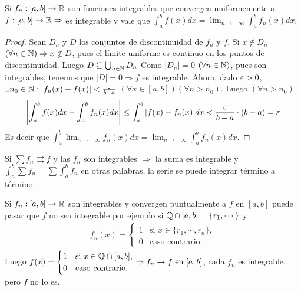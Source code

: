 \begin{theorem}
  Si \(f_n: [a, b] \to \mathbb{R}\) son funciones integrables que convergen uniformemente a \(f: [a, b] \to \mathbb{R} \Rightarrow\) es integrable y vale que \(\int_a^b f(x) dx = \lim_{n \to +\infty} \int_a^b f_n(x) dx\).
  \begin{proof}
    Sean \(D_n\) y \(D\) los conjuntos de discontinuidad de \(f_n\) y \(f\). Si \(x \notin D_n\) \((\forall n \in \mathbb{N}) \Rightarrow x \notin D\),
    pues el límite uniforme es continuo en los puntos de discontinuidad.
    Luego \(D \subseteq \bigcup_{n \in \mathbb{N}} D_n\) Como \(|D_n| = 0\) \((\forall n \in \mathbb{N})\), pues son integrables,
    tenemos que \(|D| = 0 \Rightarrow f\) es integrable. Ahora, dado \(\varepsilon > 0\),
    \(\exists n_0 \in \mathbb{N} : |f_n(x) - f(x)| < \frac{\varepsilon}{b-a}\) \((\forall x \in [a, b])(\forall n > n_0)\). Luego \((\forall n > n_0)\)
    \begin{align*}
      \left|\int_a^b f(x) dx - \int_a^b f_n(x) dx\right| \leq \int_a^b |f(x) - f_n(x)|dx < \frac{\varepsilon}{b-a} \cdot (b-a) = \varepsilon
    \end{align*}
    Es decir que \(\int_a^b \lim_{n \to +\infty} f_n(x) dx = \lim_{n \to +\infty} \int_a^b f_n(x) dx\).
  \end{proof}
\end{theorem}

\begin{corollary}
  Si \(\sum f_n \rightrightarrows f\) y las \(f_n\) son integrables \(\Rightarrow\) la suma es integrable y \(\int_a^b \sum f_n = \sum \int_a^b f_n\) en otras palabras, la serie se puede integrar término a término.
\end{corollary}

\begin{note}
  Si \(f_n: [a, b] \to \mathbb{R}\) son integrables y convergen puntualmente a \(f\) en \([a, b]\) puede pasar que \(f\) no sea integrable por ejemplo si \(\mathbb{Q} \cap [a, b] = \{r_1, \cdots\}\) y
  \begin{align*}
    f_n(x) = \begin{cases}
               1 & \text{si } x \in \{r_1, \cdots, r_n\}, \\
               0 & \text{caso contrario}.
             \end{cases}
  \end{align*}
  Luego \(f(x) = \begin{cases}
      1 & \text{si } x \in \mathbb{Q} \cap [a, b], \\
      0 & \text{caso contrario}.
    \end{cases} \Rightarrow f_n \to f \text{ en } [a, b]\), cada \(f_n\) es integrable, pero \(f\) no lo es.
\end{note}

